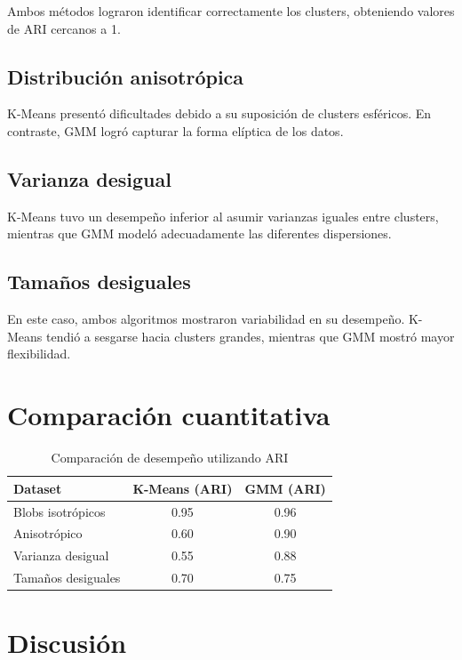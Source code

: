 \documentclass[12pt]{article}
\begin{document}
Ambos métodos lograron identificar correctamente los clusters, obteniendo valores de ARI cercanos a 1.

\subsection{Distribución anisotrópica}

K-Means presentó dificultades debido a su suposición de clusters esféricos. En contraste, GMM logró capturar la forma elíptica de los datos.

\subsection{Varianza desigual}

K-Means tuvo un desempeño inferior al asumir varianzas iguales entre clusters, mientras que GMM modeló adecuadamente las diferentes dispersiones.

\subsection{Tamaños desiguales}

En este caso, ambos algoritmos mostraron variabilidad en su desempeño. K-Means tendió a sesgarse hacia clusters grandes, mientras que GMM mostró mayor flexibilidad.

\section{Comparación cuantitativa}

\begin{table}[h]
\centering
\begin{tabular}{lcc}
\toprule
Dataset & K-Means (ARI) & GMM (ARI) \\
\midrule
Blobs isotrópicos & 0.95 & 0.96 \\
Anisotrópico & 0.60 & 0.90 \\
Varianza desigual & 0.55 & 0.88 \\
Tamaños desiguales & 0.70 & 0.75 \\
\bottomrule
\end{tabular}
\caption{Comparación de desempeño utilizando ARI}
\end{table}

\section{Discusión}
\end{document}
